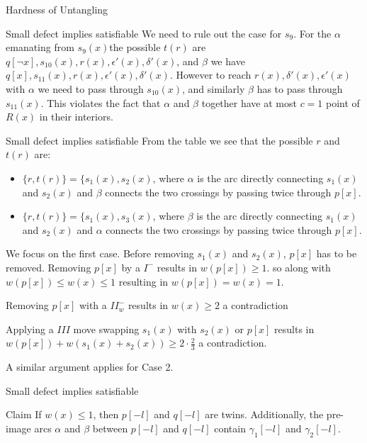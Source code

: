 \documentclass{beamer}
\begin{document}
\begin{section}{Hardness of Untangling}
    \begin{frame}{Small defect implies satisfiable}
        We need to rule out the case for $s_9$. For the $\alpha$ emanating from $s_9(x)$the possible $t(r)$ are $q[\neg x],s_{10}(x), r(x), \epsilon'(x),\delta'(x)$, and $\beta$ we have $q[x],s_{11}(x),r(x),\epsilon'(x),\delta'(x)$. 
        \newline
        \newline
        However to reach $r(x),\delta'(x),\epsilon'(x)$ with $\alpha$ we need to pass through $s_{10}(x)$, and similarly $\beta$ has to pass through $s_{11}(x)$. This violates the fact that $\alpha$ and $\beta$ together have at most $c=1$ point of $R(x)$ in their interiors.  
    \end{frame}{}
    
    \begin{frame}{Small defect implies satisfiable}
        From the table we see that the possible $r$ and $t(r)$ are:
        \begin{itemize}
            \item $\{r,t(r)\}=\{s_1(x),s_2(x)$, where $\alpha$ is the arc directly connecting $s_1(x)$ and $s_2(x)$ and $\beta$ connects the two crossings by passing twice through $p[x]$.
            \item $\{r,t(r)\}=\{s_1(x),s_3(x)$, where $\beta$ is the arc directly connecting $s_1(x)$ and $s_2(x)$ and $\alpha$ connects the two crossings by passing twice through $p[x]$.
        \end{itemize}{}
        We focus on the first case. Before removing $s_1(x)$ and $s_2(x)$, $p[x]$ has to be removed. 
        \newline
        Removing $p[x]$ by a $I^-$ results in $w(p[x])\geq 1$. so along with $w(p[x])\leq w(x) \leq 1$ resulting in $w(p[x])=w(x)=1$. 
        
        Removing $p[x]$ with a $II^-_w$ results in $w(x)\geq 2$ a contradiction
        
        Applying a $III$ move swapping $s_1(x)$ with $s_2(x)$ or $p[x]$ results in $w(p[x])+w(s_1(x)+s_2(x))\geq 2\cdot \frac{2}{3}$ a contradiction. 
        
        A similar argument applies for Case 2. 
    \end{frame}{}
    
    \begin{frame}{Small defect implies satisfiable}
        \begin{block}{Claim}
            If $w(x)\leq 1$, then $p[-l]$ and $q[-l]$ are twins. Additionally, the pre-image arcs $\alpha$ and $\beta$ between $p[-l]$ and $q[-l]$ contain $\gamma_1[-l]$ and $\gamma_2[-l]$. 
        \end{block}{}
        

\end{frame}
\end{section}
\end{document}
